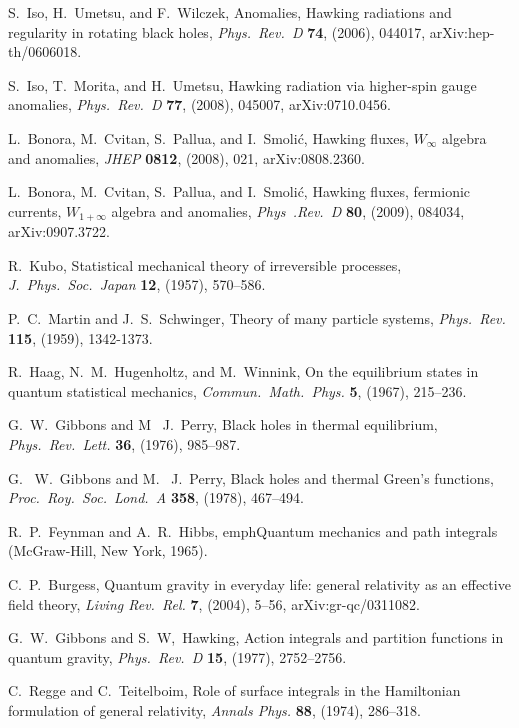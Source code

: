 \documentclass[12pt]{article}
\begin{document}
\begin{thebibliography}{999}
 S.\ Iso, H.\ Umetsu, and F.\ Wilczek, Anomalies, 
Hawking radiations and regularity in rotating black holes,
\emph{Phys.\ Rev.\ D} {\bf 74}, (2006), 044017, arXiv:hep-th/0606018.

 S.\ Iso, T.\ Morita, and H.\ Umetsu, Hawking radiation 
via higher-spin gauge anomalies, \emph{Phys.\ Rev.\ D} {\bf 77}, 
(2008), 045007, arXiv:0710.0456. 

 L.\ Bonora, M.\ Cvitan, S.\ Pallua, and I.\ Smoli{\'c},
Hawking fluxes, $W_\infty$ algebra and anomalies, \emph{JHEP} 
{\bf 0812}, (2008), 021, arXiv:0808.2360.

 L.\ Bonora, M.\ Cvitan, S.\ Pallua, and I.\ Smoli{\'c},
Hawking fluxes, fermionic currents, $W_{1+\infty}$ algebra and 
anomalies, \emph{Phys\ .Rev.\ D} {\bf 80}, (2009), 084034,
arXiv:0907.3722.

 R.\ Kubo, Statistical mechanical theory of irreversible 
processes, \emph{J.\ Phys.\ Soc.\ Japan} {\bf 12}, (1957), 570--586.

 P.~C.\ Martin and J.~S.\ Schwinger, Theory of 
many particle systems, \emph{Phys.\ Rev.} {\bf 115}, (1959),
1342-1373.

 R.\ Haag,  N.~M.\ Hugenholtz, and M.\ Winnink,
On the equilibrium states in quantum statistical mechanics,
\emph{Commun.\ Math.\ Phys.} {\bf 5}, (1967), 215--236.

  G.~W.\ Gibbons and M~ J.\ Perry, Black holes in 
thermal equilibrium, \emph{Phys.\ Rev.\ Lett.} {\bf 36}, (1976),
985--987.

 G.~ W.\ Gibbons and M.~ J.\ Perry, Black holes 
and thermal Green's functions, \emph{Proc.\ Roy.\ Soc.\
Lond.\ A} {\bf 358}, (1978), 467--494.

  R.~P.\ Feynman and A.~R.\ Hibbs, emph{Quantum
mechanics and path integrals} (McGraw-Hill, New York, 1965).

 C.~P.\ Burgess, Quantum gravity in everyday life: 
general relativity as an effective field theory, \emph{Living Rev.\ Rel.}
{\bf 7}, (2004), 5--56, arXiv:gr-qc/0311082.

 G.~W.\ Gibbons and S.~W,\ Hawking, Action 
integrals and partition functions in quantum gravity,
\emph{Phys.\ Rev.\ D} {\bf 15}, (1977), 2752--2756.

 C.\ Regge and C.\ Teitelboim, Role of surface 
integrals in the Hamiltonian formulation of general relativity,
\emph{Annals Phys.} {\bf 88}, (1974), 286--318.


\end{thebibliography}
\end{document}
